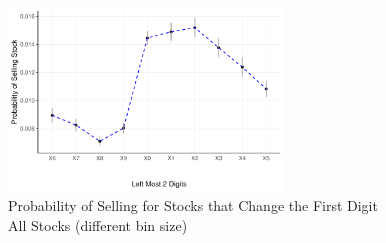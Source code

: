 \begin{figure}[hbt!]
	\centering%
	\caption{Probability of Selling  for Stocks that Change the First Digit \\ All Stocks (different bin size)}%
	\label{fig:prob_all_inc}%
	\includegraphics[width=0.65\textwidth]{figures/Left2increase_probCI.pdf}
	\fignote{}
\end{figure}


